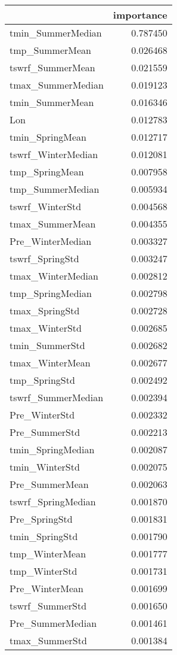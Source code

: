 \begin{tabular}{lr}
\toprule
 & importance \\
\midrule
tmin_SummerMedian & 0.787450 \\
tmp_SummerMean & 0.026468 \\
tswrf_SummerMean & 0.021559 \\
tmax_SummerMedian & 0.019123 \\
tmin_SummerMean & 0.016346 \\
Lon & 0.012783 \\
tmin_SpringMean & 0.012717 \\
tswrf_WinterMedian & 0.012081 \\
tmp_SpringMean & 0.007958 \\
tmp_SummerMedian & 0.005934 \\
tswrf_WinterStd & 0.004568 \\
tmax_SummerMean & 0.004355 \\
Pre_WinterMedian & 0.003327 \\
tswrf_SpringStd & 0.003247 \\
tmax_WinterMedian & 0.002812 \\
tmp_SpringMedian & 0.002798 \\
tmax_SpringStd & 0.002728 \\
tmax_WinterStd & 0.002685 \\
tmin_SummerStd & 0.002682 \\
tmax_WinterMean & 0.002677 \\
tmp_SpringStd & 0.002492 \\
tswrf_SummerMedian & 0.002394 \\
Pre_WinterStd & 0.002332 \\
Pre_SummerStd & 0.002213 \\
tmin_SpringMedian & 0.002087 \\
tmin_WinterStd & 0.002075 \\
Pre_SummerMean & 0.002063 \\
tswrf_SpringMedian & 0.001870 \\
Pre_SpringStd & 0.001831 \\
tmin_SpringStd & 0.001790 \\
tmp_WinterMean & 0.001777 \\
tmp_WinterStd & 0.001731 \\
Pre_WinterMean & 0.001699 \\
tswrf_SummerStd & 0.001650 \\
Pre_SummerMedian & 0.001461 \\
tmax_SummerStd & 0.001384 \\

\end{tabular}
